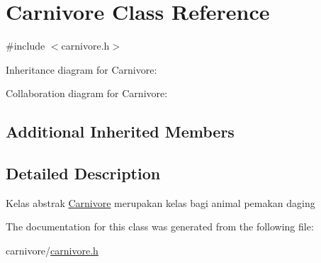 \hypertarget{classCarnivore}{}\section{Carnivore Class Reference}
\label{classCarnivore}


{\ttfamily \#include $<$carnivore.\+h$>$}



Inheritance diagram for Carnivore\+:


Collaboration diagram for Carnivore\+:
\subsection*{Additional Inherited Members}


\subsection{Detailed Description}
Kelas abstrak \hyperlink{classCarnivore}{Carnivore} merupakan kelas bagi animal pemakan daging 

The documentation for this class was generated from the following file\+:\begin{DoxyCompactItemize}
\item 
carnivore/\hyperlink{carnivore_8h}{carnivore.\+h}\end{DoxyCompactItemize}
